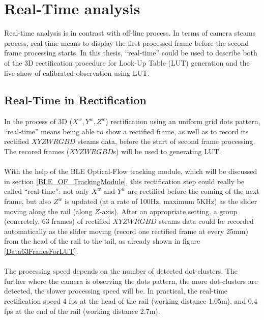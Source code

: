 \section{Real-Time analysis}
Real-time analysis is in contrast with off-line process. In terms of camera steams process, real-time means to display the first processed frame before the second frame processing starts. In this thesis, \enquote{real-time} could be used to describe both of the 3D rectification procedure for Look-Up Table (LUT) generation and the live show of calibrated observation using LUT.
\subsection{Real-Time in Rectification}
In the process of 3D (\(X^{w}\),\,\(Y^{w}\),\,\(Z^{w}\)) rectification using an uniform grid dots pattern, \enquote{real-time} means being able to show a rectified frame, as well as to record its rectified \(XYZWRGBD\) steams data, before the start of second frame processing. The recored frames (\(XYZWRGBD\)s) will be used to generating LUT.%
\\\\%
With the help of the BLE Optical-Flow tracking module, which will be discussed in section \ref{BLE_OF_TrackingModule}, this rectification step could really be called \enquote{real-time}: not only \(X^{w}\) and \(Y^{w}\) are rectified before the coming of the next frame, but also \(Z^{w}\) is updated (at a rate of 100Hz, maximum 5KHz) as the slider moving along the rail (along \(Z\)-axis). After an appropriate setting, a group (concretely, 63 frames) of rectified \(XYZWRGBD\) steams data could be recorded automatically as the slider moving (record one rectified frame at every 25mm) from the head of the rail to the tail, as already shown in figure \ref{Data63FranesForLUT}.%
\\\\%
The processing speed depends on the number of detected dot-clusters. The further where the camera is observing the dots pattern, the more dot-clusters are detected, the slower processing speed will be. In practical, the real-time rectification speed 4 fps at the head of the rail (working distance 1.05m), and 0.4 fps at the end of the rail (working distance 2.7m).
%
